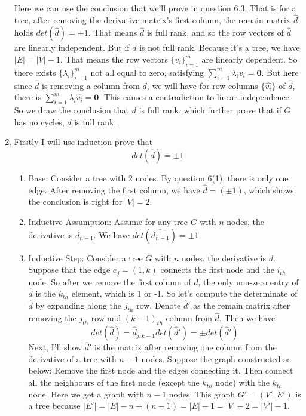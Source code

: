 \documentclass[twoside,11pt]{homework}
\begin{document}
\begin{enumerate}
    
    Here we can use the conclusion that we'll prove in question 6.3. That is for a tree, after removing the derivative matrix's first column, the remain matrix $\hat{d}$ holds $det(\hat{d}) = \pm 1$. That means $\hat{d}$ is full rank, and so the row vectors of $\hat{d}$ are linearly independent. But if $d$ is not full rank. Because it's a tree, we have $|E|=|V|-1$. That means the row vectors $\{v_i\}_{i=1}^m$ are linearly dependent. So there exists $\{\lambda_i\}_{i=1}^m$ not all equal to zero, satisfying $\sum_{i=1}^m \lambda_i v_i=\textbf{0}$. But here since $\hat{d}$ is removing a column from $d$, we will have for row columns ${\{\hat{v_i}\}}$ of $\hat{d}$, there is $\sum_{i=1}^m \lambda_i \hat{v_i}=\textbf{0}$. This causes a contradiction to linear independence. So we draw the conclusion that $d$ is full rank, which further prove that if $G$ has no cycles, $d$ is full rank.

    
    \item
    
    Firstly I will use induction prove that
    \begin{equation}
        det(\hat{d}) = \pm 1
    \end{equation}
    \begin{enumerate}
        \item Base: Consider a tree with 2 nodes. By question 6(1), there is only one edge. After removing the first column, we have $\hat{d} = (\pm 1)$, which shows the conclusion is right for $|V|=2$.
        \item Inductive Assumption: Assume for any tree $G$ with $n$ nodes, the derivative is $d_{n-1}$. We have $det(\hat{d_{n-1}})=\pm 1$
        \item Inductive Step: Consider a tree $G$ with $n$ nodes, the derivative is $d$. Suppose that the edge $e_j = (1,k)$ connects the first node and the $i_{th}$ node. So after we remove the first column of $d$, the only non-zero entry of $\hat{d}$ is the $k_{th}$ element, which is 1 or -1. So let's compute the determinate of $\hat{d}$ by expanding along the $j_{th}$ row. Denote $\hat{d}'$ as the remain matrix after removing the $j_{th}$ row and $(k-1)_{th}$ column from $\hat{d}$. Then we have 
        $$det(\hat{d}) = \hat{d}_{j,k-1} det(\hat{d}') =\pm det(\hat{d}')$$
        Next, I'll show $\hat{d}'$ is the matrix after removing one column from the derivative of a tree with $n-1 $ nodes. Suppose the graph constructed as below: Remove the first node and the edges connecting it. Then connect all the neighbours of the first node (except the $k_{th}$ node) with the $k_{th}$ node. Here we get a graph with $n-1$ nodes. This graph $G'=(V',E')$ is a tree because $|E'| = |E|-n+(n-1)=|E|-1 = |V|-2 = |V'| -1$.
        

\end{enumerate}
\end{enumerate}
\end{document}
